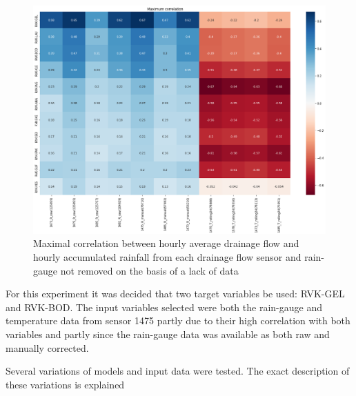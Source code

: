 \begin{figure}
\centering\includegraphics[width=\textwidth]{Pictures/Plots/max_corr_pairs.png}
\caption{Maximal correlation between hourly average drainage flow and hourly accumulated rainfall from each drainage flow sensor and rain-gauge not removed on the basis of a lack of data}
\label{fig:maxcorrpairs}
\end{figure}

For this experiment it was decided that two target variables be used: RVK-GEL and RVK-BOD. The input variables selected were both the rain-gauge and temperature data from sensor 1475 partly due to their high correlation with both variables and partly since the rain-gauge data was available as both raw and manually corrected.


Several variations of models and input data were tested. The exact description of these variations is explained 

